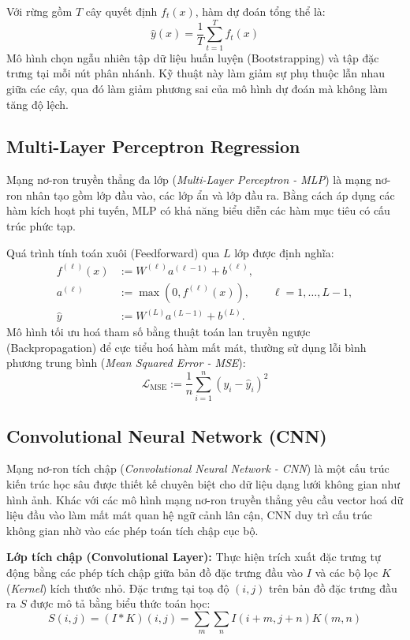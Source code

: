 Với rừng gồm $T$ cây quyết định $f_t(x)$, hàm dự đoán tổng thể là:
\[
\hat{y}(x)=\frac{1}{T}\sum_{t=1}^{T} f_t(x)
\]
Mô hình chọn ngẫu nhiên tập dữ liệu huấn luyện (Bootstrapping) và tập đặc trưng tại mỗi nút phân nhánh. Kỹ thuật này làm giảm sự phụ thuộc lẫn nhau giữa các cây, qua đó làm giảm phương sai của mô hình dự đoán mà không làm tăng độ lệch.

\subsection{Multi-Layer Perceptron Regression}
Mạng nơ-ron truyền thẳng đa lớp (\textit{Multi-Layer Perceptron - MLP}) \cite{Bishop1995NN} là mạng nơ-ron nhân tạo gồm lớp đầu vào, các lớp ẩn và lớp đầu ra. Bằng cách áp dụng các hàm kích hoạt phi tuyến, MLP có khả năng biểu diễn các hàm mục tiêu có cấu trúc phức tạp.

Quá trình tính toán xuôi (Feedforward) qua $L$ lớp được định nghĩa:
\[
\begin{aligned}
f^{(\ell)}(x) &:= W^{(\ell)}a^{(\ell-1)} + b^{(\ell)}, \\
a^{(\ell)} &:= \max\!\left(0, f^{(\ell)}(x)\right), \qquad \ell=1,\dots,L-1, \\
\hat{y} &:= W^{(L)}a^{(L-1)} + b^{(L)}.
\end{aligned}
\]
Mô hình tối ưu hoá tham số bằng thuật toán lan truyền ngược (Backpropagation) để cực tiểu hoá hàm mất mát, thường sử dụng lỗi bình phương trung bình (\textit{Mean Squared Error - MSE}):
\[
\mathcal{L}_{\mathrm{MSE}} := \frac{1}{n}\sum_{i=1}^{n}(y_i-\hat{y}_i)^2
\]

\subsection{Convolutional Neural Network (CNN)}
Mạng nơ-ron tích chập (\textit{Convolutional Neural Network - CNN}) là một cấu trúc kiến trúc học sâu được thiết kế chuyên biệt cho dữ liệu dạng lưới không gian như hình ảnh. Khác với các mô hình mạng nơ-ron truyền thẳng yêu cầu vector hoá dữ liệu đầu vào làm mất mát quan hệ ngữ cảnh lân cận, CNN duy trì cấu trúc không gian nhờ vào các phép toán tích chập cục bộ.

\textbf{Lớp tích chập (Convolutional Layer):} Thực hiện trích xuất đặc trưng tự động bằng các phép tích chập giữa bản đồ đặc trưng đầu vào $I$ và các bộ lọc $K$ (\textit{Kernel}) kích thước nhỏ. Đặc trưng tại toạ độ $(i,j)$ trên bản đồ đặc trưng đầu ra $S$ được mô tả bằng biểu thức toán học:
$$
S(i,j) = (I * K)(i,j) = \sum_m \sum_n I(i+m, j+n) K(m,n)
$$

